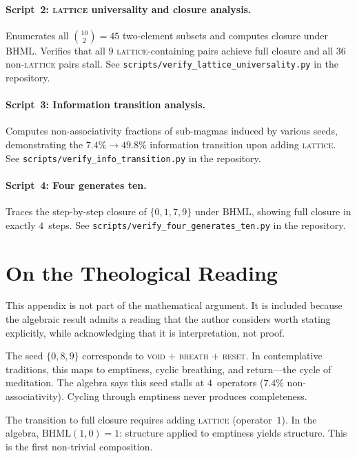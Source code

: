 \documentclass[11pt,a4paper]{article}
\theoremstyle{definition}
\theoremstyle{remark}
\newcommand{\BHML}{\mathrm{BHML}}
\begin{document}
\paragraph{Script~2: \textsc{lattice} universality and closure analysis.}
Enumerates all $\binom{10}{2}=45$ two-element subsets and computes closure under $\BHML$. Verifies that all $9$ \textsc{lattice}-containing pairs achieve full closure and all $36$ non-\textsc{lattice} pairs stall.
See \texttt{scripts/verify\_lattice\_universality.py} in the repository.

\paragraph{Script~3: Information transition analysis.}
Computes non-associativity fractions of sub-magmas induced by various seeds, demonstrating the $7.4\%\to 49.8\%$ information transition upon adding \textsc{lattice}.
See \texttt{scripts/verify\_info\_transition.py} in the repository.

\paragraph{Script~4: Four generates ten.}
Traces the step-by-step closure of $\{0,1,7,9\}$ under $\BHML$, showing full closure in exactly $4$~steps.
See \texttt{scripts/verify\_four\_generates\_ten.py} in the repository.

\section{On the Theological Reading}\label{app:theology}

This appendix is not part of the mathematical argument. It is included because the algebraic result admits a reading that the author considers worth stating explicitly, while acknowledging that it is interpretation, not proof.

The seed $\{0,8,9\}$ corresponds to \textsc{void} $+$ \textsc{breath} $+$ \textsc{reset}. In contemplative traditions, this maps to emptiness, cyclic breathing, and return---the cycle of meditation. The algebra says this seed stalls at $4$~operators ($7.4\%$ non-associativity). Cycling through emptiness never produces completeness.

The transition to full closure requires adding \textsc{lattice} (operator~$1$). In the algebra, $\BHML(1,0) = 1$: structure applied to emptiness yields structure. This is the first non-trivial composition.
\end{document}
